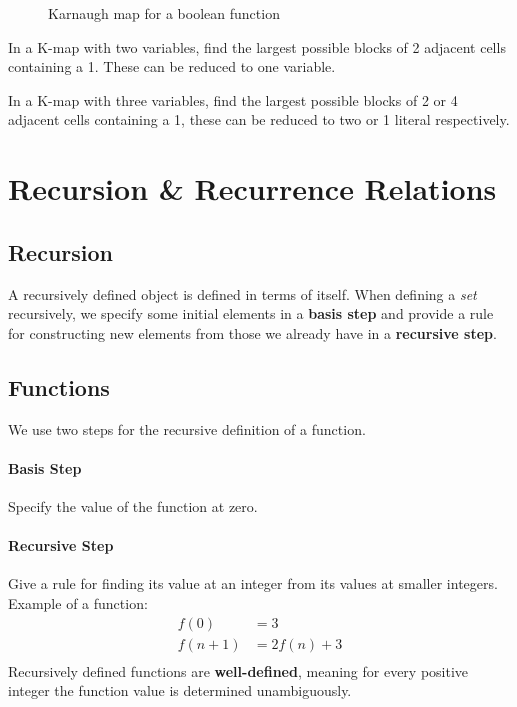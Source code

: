 \begin{figure}[H]
	\centering
	\begin{karnaugh-map}[2][2][1][\( y \) ][\( x \) ]
	\end{karnaugh-map}
	\caption{Karnaugh map for a boolean function}\label{fig:karnaugh}
\end{figure}

In a K-map with two variables, find the largest possible blocks of 2 adjacent cells containing a 1. These can be reduced to one variable.

In a K-map with three variables, find the largest possible blocks of 2 or 4 adjacent cells containing a 1, these can be reduced to two or 1 literal respectively.



\section{Recursion \& Recurrence Relations}
\subsection{Recursion}
A recursively defined object is defined in terms of itself. When defining a \emph{set} recursively, we specify some initial elements in a \textbf{basis step} and provide a rule for constructing new elements from those we already have in a \textbf{recursive step}.
\subsection{Functions}
We use two steps for the recursive definition of a function.
\paragraph{Basis Step} Specify the value of the function at zero.
\paragraph{Recursive Step} Give a rule for finding its value at an integer from its values at smaller integers.
Example of a function:
\begin{align*}
	f(0)&=3 \\
	f(n+1)&= 2f(n)+3 \\
\end{align*}
Recursively defined functions are \textbf{well-defined}, meaning for every positive integer the function value is determined unambiguously.


